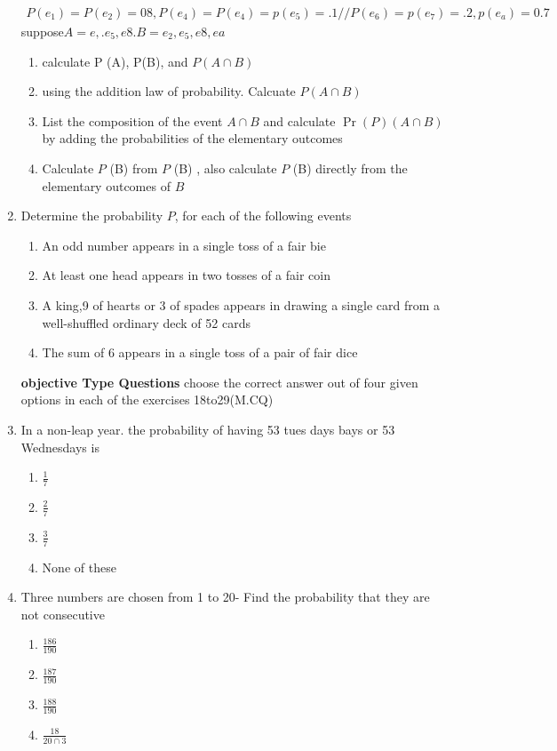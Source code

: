 \documentclass[12pt]{article}
\providecommand{\pr}[1]{\ensuremath{\Pr\left(#1\right)}}
\begin{document}
\begin{enumerate}
\begin{align}
 P(e_1)=P(e_2)=08, P(e_4)=P(e_4)=p(e_5)=.1//
P(e_6)=p(e_7)=.2,p(e_a)=0.7
	\end{align}
suppose$A={e,.e_5,e8}.B={e_2,e_5,e8, ea}$
\begin{enumerate}
\item calculate P (A), P(B), and $P(A\cap B)$
\item using the addition law of probability. Calcuate $P(A\cap B)$
\item List the composition of the event $A\cap B$ and calculate $\pr{P} (A\cap B)$ by adding the probabilities of the elementary outcomes
\item Calculate $P$ (B) from $P$ (B) , also calculate $P$ (B) directly from the elementary outcomes of $B$
	\end{enumerate}
\item Determine the probability $P$, for each of the following events
	\begin{enumerate}
\item An odd number appears in a single toss of a fair bie
\item At least one head appears in two tosses of a fair coin 
\item A king,9 of hearts or 3 of spades appears in drawing a single card from a well-shuffled ordinary deck of 52 cards
\item The sum of 6 appears in a single toss of a pair of fair dice
	\end{enumerate}
\textbf{objective Type Questions}
choose the correct answer out of four given options in each of the exercises 18to29(M.CQ)
\item In a non-leap year. the probability of having 53 tues days bays or 53 Wednesdays is
	\begin{enumerate}
\item $\frac{1}{7}$
\item $\frac{2}{7}$
\item $\frac{3}{7}$
\item None of these
	\end{enumerate}
\item Three numbers are chosen from 1 to 20- Find the probability that they are not consecutive
	\begin{enumerate}
\item $\frac{186}{190}$
\item $\frac{187}{190}$
\item $\frac{188}{190}$
\item $\frac{18}{20\cap3}$
	\end{enumerate}

\end{enumerate}
\end{document}
